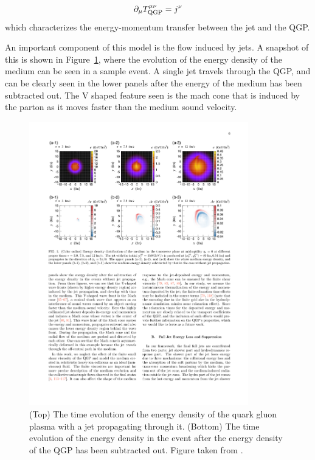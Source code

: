\begin{align}
 \partial_\mu T_{\rm QGP}^{\mu\nu} = j^\nu
\end{align}
which characterizes the energy-momentum transfer between the jet and the QGP. 

An important component of this model is the flow induced by jets. A snapshot of this is shown in Figure~\ref{fig:jf_snapshot}, where the evolution of the energy density of the medium can be seen in a sample event. A single jet travels through the QGP, and can be clearly seen in the lower panels after the energy of the medium has been subtracted out. The V shaped feature seen is the mach cone that is induced by the parton as it moves faster than the medium sound velocity. 

\begin{figure}[htbp]
\begin{center}
\includegraphics[width=0.85\textwidth]{figures/jetMeasurements/JF_snapshot}
\caption{(Top) The time evolution of the energy density of the quark gluon plasma with a jet propagating through it. (Bottom) The time evolution of the energy density in the event after the energy density of the QGP has been subtracted out. Figure taken from \cite{Tachibana:2017syd}.}
\label{fig:jf_snapshot}
\end{center}
\end{figure}

